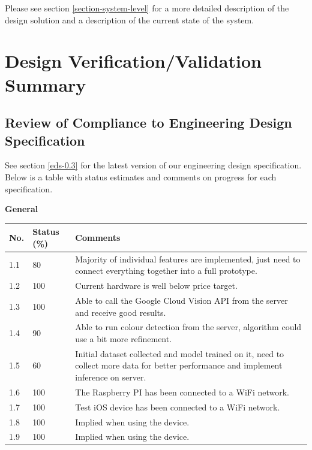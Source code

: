 \documentclass[a4paper,11pt]{article}
\begin{document}
Please see section \ref{section-system-level} for a more detailed description of the design solution and a description of the current state of the system.

\section{Design Verification/Validation Summary}
\subsection{Review of Compliance to Engineering Design Specification}
See section \ref{eds-0.3} for the latest version of our engineering design specification. Below is a table with status estimates and comments on progress for each specification.

\textbf{General}
\begin{table}[ht]
    \centering
    \begin{tabular}{|p{0.7cm}|p{1cm}|p{12cm}|}
        \hline
        No. & Status (\%) & Comments \\ \hline
        
        1.1 & 80 & Majority of individual features are implemented, just need to connect everything together into a full prototype. \\ \hline
        
        1.2 & 100 & Current hardware is well below price target. \\ \hline
        
        1.3 & 100 & Able to call the Google Cloud Vision API from the server and receive good results. \\ \hline
        
        1.4 & 90 & Able to run colour detection from the server, algorithm could use a bit more refinement. \\ \hline
        
        1.5 & 60 & Initial dataset collected and model trained on it, need to collect more data for better performance and implement inference on server. \\ \hline
        
        1.6 & 100 & The Raspberry PI has been connected to a WiFi network. \\ \hline
        
        1.7 & 100 & Test iOS device has been connected to a WiFi network. \\ \hline
        
        1.8 & 100 & Implied when using the device. \\ \hline
        
        1.9 & 100 & Implied when using the device. \\ \hline
    \end{tabular}
\end{table}
\end{document}
